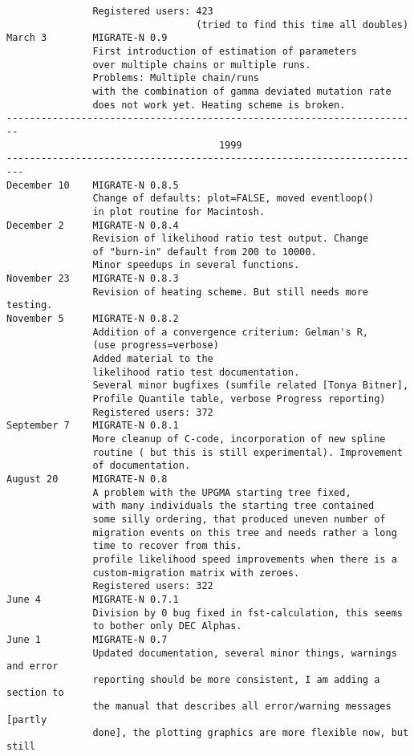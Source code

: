 \begin{small}
\begin{verbatim}
               Registered users: 423 
                                 (tried to find this time all doubles)
March 3        MIGRATE-N 0.9
               First introduction of estimation of parameters 
               over multiple chains or multiple runs. 
               Problems: Multiple chain/runs 
               with the combination of gamma deviated mutation rate 
               does not work yet. Heating scheme is broken.
------------------------------------------------------------------------
                                     1999
-------------------------------------------------------------------------
December 10    MIGRATE-N 0.8.5
               Change of defaults: plot=FALSE, moved eventloop()
               in plot routine for Macintosh.
December 2     MIGRATE-N 0.8.4
               Revision of likelihood ratio test output. Change
               of "burn-in" default from 200 to 10000.
               Minor speedups in several functions.
November 23    MIGRATE-N 0.8.3
               Revision of heating scheme. But still needs more testing.
November 5     MIGRATE-N 0.8.2
               Addition of a convergence criterium: Gelman's R,
               (use progress=verbose)
               Added material to the 
               likelihood ratio test documentation.  
               Several minor bugfixes (sumfile related [Tonya Bitner],
               Profile Quantile table, verbose Progress reporting)
               Registered users: 372 
September 7    MIGRATE-N 0.8.1
               More cleanup of C-code, incorporation of new spline
               routine ( but this is still experimental). Improvement
               of documentation.
August 20      MIGRATE-N 0.8
               A problem with the UPGMA starting tree fixed,
               with many individuals the starting tree contained 
               some silly ordering, that produced uneven number of
               migration events on this tree and needs rather a long
               time to recover from this.
               profile likelihood speed improvements when there is a
               custom-migration matrix with zeroes.
               Registered users: 322
June 4         MIGRATE-N 0.7.1
               Division by 0 bug fixed in fst-calculation, this seems
               to bother only DEC Alphas.
June 1         MIGRATE-N 0.7
               Updated documentation, several minor things, warnings and error
               reporting should be more consistent, I am adding a section to
               the manual that describes all error/warning messages [partly
               done], the plotting graphics are more flexible now, but still

\end{verbatim}
\end{small}
